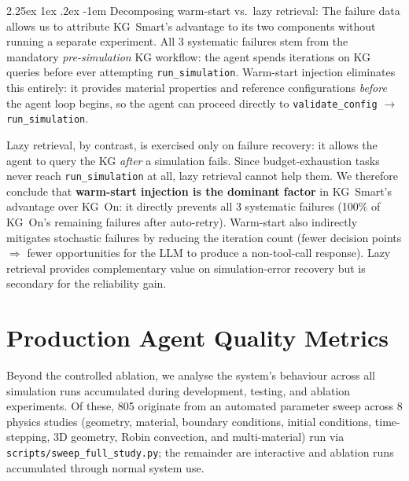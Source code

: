 \documentclass[preprint,review,12pt]{elsarticle}
\makeatletter
\renewcommand\paragraph{\@startsection{paragraph}{4}{\z@}%
  {2.25ex \@plus1ex \@minus.2ex}%
  {-1em}%
  {\normalfont\normalsize\bfseries}}
\makeatother
\begin{document}
\paragraph{Decomposing warm-start vs.\ lazy retrieval:}
The failure data allows us to attribute KG~Smart's advantage to its
two components without running a separate experiment.  All 3 systematic
failures stem from the mandatory \emph{pre-simulation} KG workflow:
the agent spends iterations on KG queries before ever attempting
\texttt{run\_simulation}.  Warm-start injection eliminates this
entirely: it provides material properties and reference configurations
\emph{before} the agent loop begins, so the agent can proceed directly
to \texttt{validate\_config} $\to$ \texttt{run\_simulation}.

Lazy retrieval, by contrast, is exercised only on failure recovery:
it allows the agent to query the KG \emph{after} a simulation fails.
Since budget-exhaustion tasks never reach \texttt{run\_simulation}
at all, lazy retrieval cannot help them.  We therefore conclude
that \textbf{warm-start injection is the dominant factor} in
KG~Smart's advantage over KG~On: it directly prevents all 3 systematic
failures (100\% of KG~On's remaining failures after auto-retry).
Warm-start also indirectly mitigates stochastic failures by reducing
the iteration count (fewer decision points $\Rightarrow$ fewer
opportunities for the LLM to produce a non-tool-call response).
Lazy retrieval provides complementary value on simulation-error
recovery but is secondary for the reliability gain.

\section{Production Agent Quality Metrics}
\label{sec:metrics}

Beyond the controlled ablation, we analyse the system's behaviour across all
simulation runs accumulated during development, testing, and ablation
experiments.  Of these, 805 originate from an automated parameter sweep across 8 physics
studies (geometry, material, boundary conditions, initial conditions,
time-stepping, 3D geometry, Robin convection, and multi-material) run via
\texttt{scripts/sweep\_full\_study.py}; the remainder are interactive and
ablation runs accumulated through normal system use.
\end{document}
